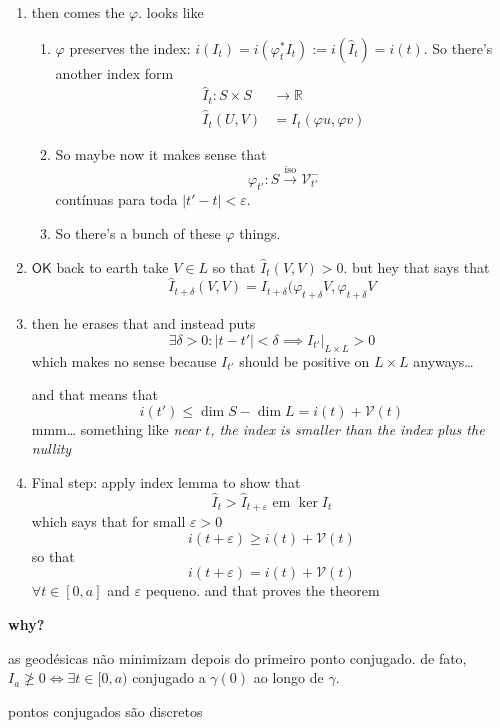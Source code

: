 \begin{enumerate}
\item then comes the \(\varphi\). looks like
\begin{enumerate}[label=(\alph*)]
\item \(\varphi\) preserves the index: \(i(I_t)=i(\varphi_t^*I_t):=i(\hat{I}_t)=i(t)\). So there's another index form
	\begin{align*}
		\hat{I}_t: S \times S &\longrightarrow \mathbb{R} \\
		\hat{I}_t(U,V) &= I_t(\varphi u,\varphi v)
	\end{align*}
\item So maybe now it makes sense that
	\[\varphi_{t'}:S \overset{\operatorname{iso}}{\longrightarrow}\mathcal{V}_{t'}^-\]
	contínuas para toda \(|t'-t|<\varepsilon\).
\item So there's a bunch of these \(\varphi\) things.
\end{enumerate}
\item \(\mathsf{OK}\) back to earth take \(V \in L\) so that \(\hat{I}_t(V,V)>0\). but hey that says that
	\[\hat{I}_{t+\delta}(V,V)=I_{t+\delta}(\varphi_{t+\delta}V,\varphi_{t+\delta}V\]
\item then he erases that and instead puts
	\[\exists  \delta>0: |t-t'|<\delta \implies I_{t'}|_{L \times L}>0\]
	 {\color{2}which makes no sense} because \(I_{t'}\) should be positive on \(L \times L\) anyways…

	 and that means that
	 \[i(t') \leq \dim S- \dim L=i(t)+\mathcal{V}(t)\]
	 mmm… something like \textit{near \(t\), the index is smaller than the index plus the nullity} 
\item Final step: apply index lemma to show that
	\[\hat{I}_t > \hat{I}_{t+\varepsilon}\text{ em } \ker I_t\]
which says that for small \(\varepsilon>0\) 
\[i(t+\varepsilon)\geq  i(t)+\mathcal{V}(t)\]
so that
\[\boxed{i(t+\varepsilon)=i(t)+\mathcal{V}(t)}\]
\( \forall t \in [0,a]\) and  \(\varepsilon\) pequeno. and that proves the theorem
	
\end{enumerate}
\textbf{why?}


\begin{coro}\leavevmode
as geodésicas não minimizam depois do primeiro ponto conjugado. de fato, \(I_a \not\geq 0\iff\exists t\in[0,a)\) conjugado a \(\gamma(0)\) ao longo de \(\gamma\).
\end{coro}

\begin{coro}\leavevmode
pontos conjugados são discretos
\end{coro}


